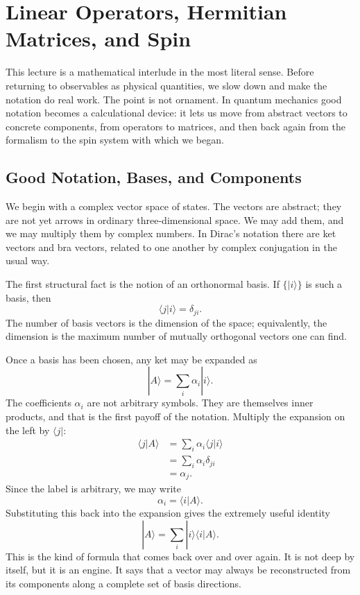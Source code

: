 \chapter{Linear Operators, Hermitian Matrices, and Spin}

This lecture is a mathematical interlude in the most literal sense. Before returning to observables as physical quantities, we slow down and make the notation do real work. The point is not ornament. In quantum mechanics good notation becomes a calculational device: it lets us move from abstract vectors to concrete components, from operators to matrices, and then back again from the formalism to the spin system with which we began.

\section{Good Notation, Bases, and Components}

We begin with a complex vector space of states. The vectors are abstract; they are not yet arrows in ordinary three-dimensional space. We may add them, and we may multiply them by complex numbers. In Dirac's notation there are ket vectors and bra vectors, related to one another by complex conjugation in the usual way.

The first structural fact is the notion of an orthonormal basis. If \(\{|i\rangle\}\) is such a basis, then
\begin{equation}
\langle j|i\rangle=\delta_{ji}.
\end{equation}
The number of basis vectors is the dimension of the space; equivalently, the dimension is the maximum number of mutually orthogonal vectors one can find.

Once a basis has been chosen, any ket may be expanded as
\begin{equation}
|A\rangle=\sum_i \alpha_i |i\rangle.
\end{equation}
The coefficients \(\alpha_i\) are not arbitrary symbols. They are themselves inner products, and that is the first payoff of the notation. Multiply the expansion on the left by \(\langle j|\):
\begin{align}
\langle j|A\rangle
  &= \sum_i \alpha_i \langle j|i\rangle \\
  &= \sum_i \alpha_i \delta_{ji} \\
  &= \alpha_j.
\end{align}
Since the label is arbitrary, we may write
\begin{equation}
\alpha_i=\langle i|A\rangle.
\end{equation}
Substituting this back into the expansion gives the extremely useful identity
\begin{equation}
|A\rangle=\sum_i |i\rangle\langle i|A\rangle.
\end{equation}
This is the kind of formula that comes back over and over again. It is not deep by itself, but it is an engine. It says that a vector may always be reconstructed from its components along a complete set of basis directions.

